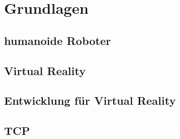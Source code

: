 \chapter{Grundlagen}
\section{humanoide Roboter}
\section{Virtual Reality}
\section{Entwicklung für Virtual Reality}
\section{TCP}